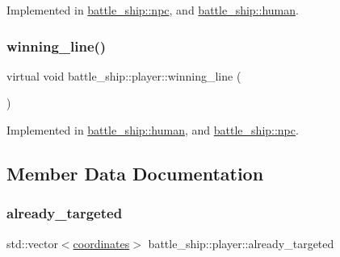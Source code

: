 Implemented in \hyperlink{classbattle__ship_1_1npc_ab81843d30e5f8801a8fe479d44ead157}{battle\+\_\+ship\+::npc}, and \hyperlink{classbattle__ship_1_1human_a5b7e6cad4d1f187907a205b767a2fd7d}{battle\+\_\+ship\+::human}.

\mbox{\label{classbattle__ship_1_1player_a3110ec708fd8fc7e02a6e88a63d57d2f}} 
\subsubsection{\texorpdfstring{winning\+\_\+line()}{winning\_line()}}
{\footnotesize\ttfamily virtual void battle\+\_\+ship\+::player\+::winning\+\_\+line (\begin{DoxyParamCaption}{ }\end{DoxyParamCaption})\hspace{0.3cm}{\ttfamily [pure virtual]}}



Implemented in \hyperlink{classbattle__ship_1_1human_a583d0a9dd05c16f700d0d1825916faa3}{battle\+\_\+ship\+::human}, and \hyperlink{classbattle__ship_1_1npc_a10c65edd38e75ac6be91ecd2dc9c9866}{battle\+\_\+ship\+::npc}.



\subsection{Member Data Documentation}
\mbox{\label{classbattle__ship_1_1player_ac0905b76a660cd06e5fd45f4960d48f9}} 
\subsubsection{\texorpdfstring{already\+\_\+targeted}{already\_targeted}}
{\footnotesize\ttfamily std\+::vector$<$\hyperlink{structbattle__ship_1_1coordinates}{coordinates}$>$ battle\+\_\+ship\+::player\+::already\+\_\+targeted\hspace{0.3cm}{\ttfamily [protected]}}



